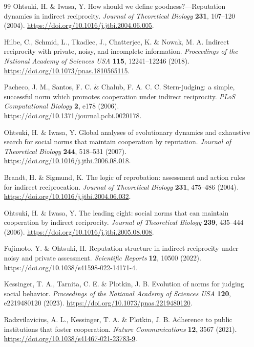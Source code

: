\documentclass[fleqn,10pt]{wlscirep}
\begin{document}
\begin{thebibliography}{99}
Ohtsuki, H. \& Iwasa, Y.
How should we define goodness?---Reputation dynamics in indirect reciprocity.
\textit{Journal of Theoretical Biology} \textbf{231}, 107--120 (2004).
\url{https://doi.org/10.1016/j.jtbi.2004.06.005}.

Hilbe, C., Schmid, L., Tkadlec, J., Chatterjee, K. \& Nowak, M. A.
Indirect reciprocity with private, noisy, and incomplete information.
\textit{Proceedings of the National Academy of Sciences USA} \textbf{115}, 12241--12246 (2018).
\url{https://doi.org/10.1073/pnas.1810565115}.

Pacheco, J. M., Santos, F. C. \& Chalub, F. A. C. C.
Stern-judging: a simple, successful norm which promotes cooperation
under indirect reciprocity.
\textit{PLoS Computational Biology} \textbf{2}, e178 (2006).
\url{https://doi.org/10.1371/journal.pcbi.0020178}.

Ohtsuki, H. \& Iwasa, Y.
Global analyses of evolutionary dynamics and exhaustive search for
social norms that maintain cooperation by reputation.
\textit{Journal of Theoretical Biology} \textbf{244}, 518--531 (2007).
\url{https://doi.org/10.1016/j.jtbi.2006.08.018}.

Brandt, H. \& Sigmund, K.
The logic of reprobation: assessment and action rules for indirect
reciprocation.
\textit{Journal of Theoretical Biology} \textbf{231}, 475--486 (2004).
\url{https://doi.org/10.1016/j.jtbi.2004.06.032}.

Ohtsuki, H. \& Iwasa, Y.
The leading eight: social norms that can maintain cooperation by indirect reciprocity.
\textit{Journal of Theoretical Biology} \textbf{239}, 435--444 (2006).
\url{https://doi.org/10.1016/j.jtbi.2005.08.008}.

Fujimoto, Y. \& Ohtsuki, H.
Reputation structure in indirect reciprocity under noisy and private assessment.
\textit{Scientific Reports} \textbf{12}, 10500 (2022).
\url{https://doi.org/10.1038/s41598-022-14171-4}.

Kessinger, T. A., Tarnita, C. E. \& Plotkin, J. B.
Evolution of norms for judging social behavior.
\textit{Proceedings of the National Academy of Sciences USA}
\textbf{120}, e2219480120 (2023).
\url{https://doi.org/10.1073/pnas.2219480120}.

Radzvilavicius, A. L., Kessinger, T. A. \& Plotkin, J. B.
Adherence to public institutions that foster cooperation.
\textit{Nature Communications} \textbf{12}, 3567 (2021).
\url{https://doi.org/10.1038/s41467-021-23783-9}.


\end{thebibliography}
\end{document}
